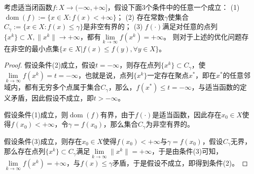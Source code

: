 \begin{theorem}[Weierstrass定理]
    考虑适当闭函数$f: X \rightarrow (-\infty, +\infty]$，假设下面3个条件中的任意一个成立：
    (1) $\mathop{\mathrm{dom}} (f):=\{x\in X: f(x) < +\infty\}$；
    (2) 存在常数$\gamma$使集合$C_{\gamma}:=\{x\in X: f(x) \leq \gamma\}$是非空有界的；
    (3) $f(\cdot)$满足对任意的点列$\{x^{k}\}\subset X, \|x^{k}\|\rightarrow +\infty$，都有$\lim\limits_{k\rightarrow \infty} f(x^{k})=+\infty$。
则对于上述的优化问题存在非空的最小点集$\{x\in X | f(x) \leq f(y), \forall y\in X\}$。
\end{theorem}
\begin{proof}
    假设条件(2)成立，假设$t=-\infty$，则存在点列$\{x^{k}\}\subset C_{\gamma}$，使$\lim\limits_{k\rightarrow \infty}f(x^{k})=t=-\infty$，也就是说，点列$\{x^{k}\}$一定存在聚点$x^{*}$，即在$x^{*}$的任意邻域内，都有无穷多个点属于集合$C_{\gamma}$，那么，$f(x^{*})\leq t=-\infty$，与适当函数的定义矛盾，因此假设不成立，即$t>-\infty$。

    假设条件(1)成立，则$\mathop{\mathrm{dom}} (f)$有界，由于$f(\cdot)$是适当函数，因此存在$x_{0}\in X$使得$f(x_{0})<+\infty$，令$\gamma = f(x_{0})$，那么集合$C_{\gamma}$为非空有界的。

    假设条件(3)成立，则存在$x_{0}\in X$使得$f(x_{0})<+\infty$与$\gamma = f(x_{0})$，假设$C_{\gamma}$无界，那么存在点列$\{x^{k}\}\subset C_{\gamma}$满足$\lim\limits_{k\rightarrow \infty} \|x^{k}\| = +\infty$，于是由条件(3)可知，$\lim\limits_{k\rightarrow \infty}f(x^{k})=+\infty$，与$f(x)\leq \gamma$矛盾，于是假设不成立，即得到条件(2)。
\end{proof}

